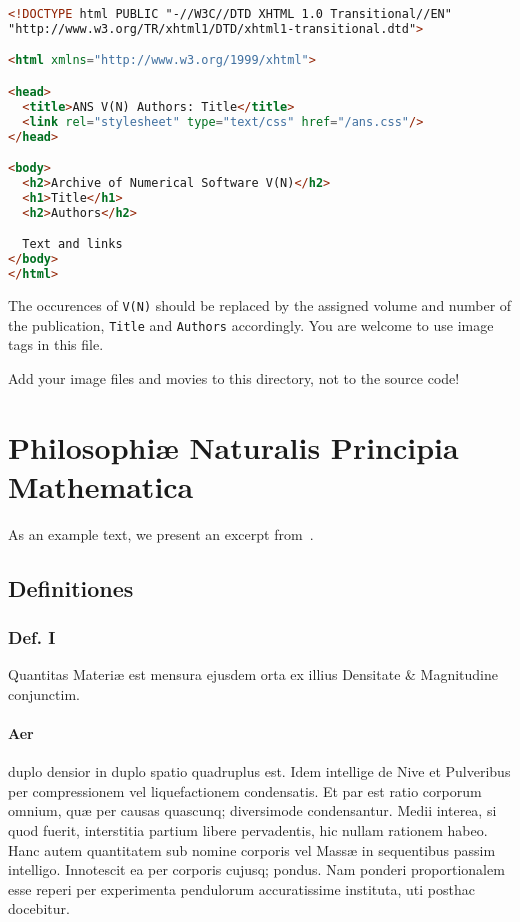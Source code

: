 \documentclass{ansarticle}
\begin{document}
\begin{lstlisting}[language=html]
<!DOCTYPE html PUBLIC "-//W3C//DTD XHTML 1.0 Transitional//EN"
"http://www.w3.org/TR/xhtml1/DTD/xhtml1-transitional.dtd">

<html xmlns="http://www.w3.org/1999/xhtml">

<head>
  <title>ANS V(N) Authors: Title</title>
  <link rel="stylesheet" type="text/css" href="/ans.css"/>
</head>

<body>
  <h2>Archive of Numerical Software V(N)</h2>
  <h1>Title</h1>
  <h2>Authors</h2>

  Text and links
</body>
</html>
\end{lstlisting}

The occurences of \lstinline[language=html]!V(N)! should be replaced
by the assigned volume and number of the publication,
\lstinline[language=html]!Title! and
\lstinline[language=html]!Authors! accordingly.  You are welcome to
use image tags in this file.

Add your image files and movies to this directory, not to the source
code!

\section{Philosophi\ae{} Naturalis Principia Mathematica}


As an example text, we present an excerpt from~\citet{Newton1687}.

\subsection{Definitiones}

\subsubsection{Def. I}

Quantitas Materi\ae{} est mensura ejusdem orta ex illius Densitate \&
Magnitudine conjunctim.

\paragraph{Aer}  duplo densior in duplo spatio quadruplus est. Idem
intellige de Nive et Pulveribus per compressionem vel liquefactionem
condensatis. Et par est ratio corporum omnium, qu\ae{} per causas
quascunq; diversimode condensantur. Medii interea, si quod fuerit,
interstitia partium libere pervadentis, hic nullam rationem
habeo. Hanc autem quantitatem sub nomine corporis vel Mass\ae{} in
sequentibus passim intelligo. Innotescit ea per corporis cujusq;
pondus. Nam ponderi proportionalem esse reperi per experimenta
pendulorum accuratissime instituta, uti posthac docebitur.
\end{document}
